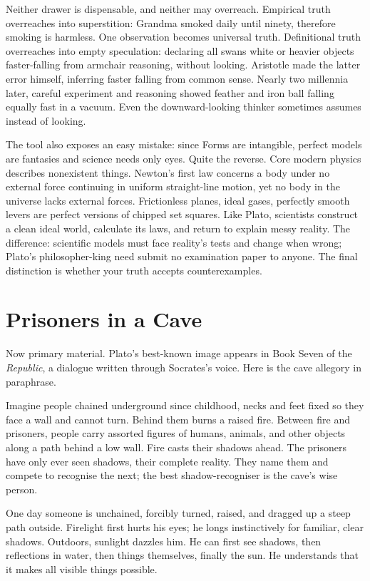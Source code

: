 Neither drawer is dispensable, and neither may overreach. Empirical truth overreaches into superstition: Grandma smoked daily until ninety, therefore smoking is harmless. One observation becomes universal truth. Definitional truth overreaches into empty speculation: declaring all swans white or heavier objects faster-falling from armchair reasoning, without looking. Aristotle made the latter error himself, inferring faster falling from common sense. Nearly two millennia later, careful experiment and reasoning showed feather and iron ball falling equally fast in a vacuum. Even the downward-looking thinker sometimes assumes instead of looking.

The tool also exposes an easy mistake: since Forms are intangible, perfect models are fantasies and science needs only eyes. Quite the reverse. Core modern physics describes nonexistent things. Newton's first law concerns a body under no external force continuing in uniform straight-line motion, yet no body in the universe lacks external forces. Frictionless planes, ideal gases, perfectly smooth levers are perfect versions of chipped set squares. Like Plato, scientists construct a clean ideal world, calculate its laws, and return to explain messy reality. The difference: scientific models must face reality's tests and change when wrong; Plato's philosopher-king need submit no examination paper to anyone. The final distinction is whether your truth accepts counterexamples.

\section{Prisoners in a Cave}
Now primary material. Plato's best-known image appears in Book Seven of the \textit{Republic}, a dialogue written through Socrates's voice. Here is the cave allegory in paraphrase.

Imagine people chained underground since childhood, necks and feet fixed so they face a wall and cannot turn. Behind them burns a raised fire. Between fire and prisoners, people carry assorted figures of humans, animals, and other objects along a path behind a low wall. Fire casts their shadows ahead. The prisoners have only ever seen shadows, their complete reality. They name them and compete to recognise the next; the best shadow-recogniser is the cave's wise person.

One day someone is unchained, forcibly turned, raised, and dragged up a steep path outside. Firelight first hurts his eyes; he longs instinctively for familiar, clear shadows. Outdoors, sunlight dazzles him. He can first see shadows, then reflections in water, then things themselves, finally the sun. He understands that it makes all visible things possible.

